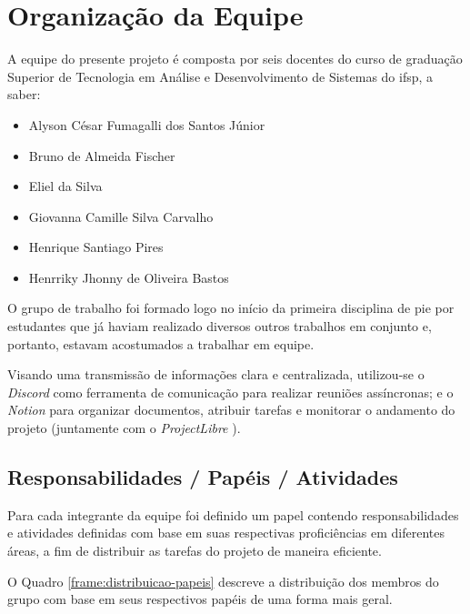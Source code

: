 \section{Organização da Equipe}

A equipe do presente projeto é composta por seis docentes do curso de graduação Superior de Tecnologia em Análise e Desenvolvimento de Sistemas do \gls{ifsp}, a saber:

\begin{itemize}
	\item Alyson César Fumagalli dos Santos Júnior
	\item Bruno de Almeida Fischer
	\item Eliel da Silva
	\item Giovanna Camille Silva Carvalho
	\item Henrique Santiago Pires
	\item Henrriky Jhonny de Oliveira Bastos
\end{itemize}

O grupo de trabalho foi formado logo no início da primeira disciplina de \gls{pie} por estudantes que já haviam realizado diversos outros trabalhos em conjunto e, portanto, estavam acostumados a trabalhar em equipe.

Visando uma transmissão de informações clara e centralizada, utilizou-se o \emph{Discord} \cite{discord-2025} como ferramenta de comunicação para realizar reuniões assíncronas; e o \emph{Notion} \cite{notion-2025} para organizar documentos, atribuir tarefas e monitorar o andamento do projeto (juntamente com o \emph{ProjectLibre} \cite{projectlibre-2025}).

\subsection{Responsabilidades / Papéis / Atividades}
\label{subsec:papeis-equipe}

Para cada integrante da equipe foi definido um papel contendo responsabilidades e atividades definidas com base em suas respectivas proficiências em diferentes áreas, a fim de distribuir as tarefas do projeto de maneira eficiente.

O Quadro \ref{frame:distribuicao-papeis} descreve a distribuição dos membros do grupo com base em seus respectivos papéis de uma forma mais geral.


